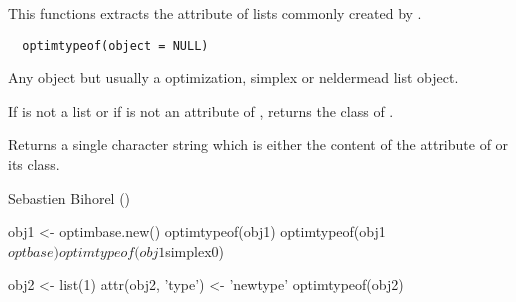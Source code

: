%
\begin{Description}\relax
This functions extracts the  attribute of lists commonly created
by .
\end{Description}
%
\begin{Usage}
\begin{verbatim}
  optimtypeof(object = NULL)
\end{verbatim}
\end{Usage}
%
\begin{Arguments}
\begin{ldescription}
\item[\code{object}] Any object but usually a optimization, simplex or neldermead
list object.
\end{ldescription}
\end{Arguments}
%
\begin{Details}\relax
If  is not a list or if  is not an attribute of
,  returns the class of .
\end{Details}
%
\begin{Value}
Returns a single character string which is either the content of the
 attribute of  or its class.
\end{Value}
%
\begin{Author}\relax
Sebastien Bihorel ()
\end{Author}
%
\begin{SeeAlso}\relax
{}
\end{SeeAlso}
%
\begin{Examples}
\begin{ExampleCode}
  obj1 <- optimbase.new()
  optimtypeof(obj1)
  optimtypeof(obj1$optbase)
  optimtypeof(obj1$simplex0)

  obj2 <- list(1)
  attr(obj2, 'type') <- 'newtype'
  optimtypeof(obj2)
\end{ExampleCode}
\end{Examples}
